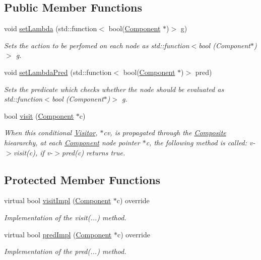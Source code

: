 \subsection*{Public Member Functions}
\begin{DoxyCompactItemize}
\item 
void \hyperlink{classVisitorLambda_a77004dd1388b4b7ebc5d1d6fe1adb747}{set\+Lambda} (std\+::function$<$ bool(\hyperlink{classComponent}{Component} $\ast$)$>$ g)
\begin{DoxyCompactList}\small\item\em Sets the action to be perfomed on each node as std\+::function$<$bool (\+Component$\ast$)$>$ g. \end{DoxyCompactList}\item 
void \hyperlink{classVisitorLambda_a46d9cc856e3fbc7155dd2212981a8902}{set\+Lambda\+Pred} (std\+::function$<$ bool(\hyperlink{classComponent}{Component} $\ast$)$>$ pred)
\begin{DoxyCompactList}\small\item\em Sets the predicate which checks whether the node should be evaluated as std\+::function$<$bool (\+Component$\ast$)$>$ g. \end{DoxyCompactList}\item 
bool \hyperlink{classVisitor_a3f8ea7ad6aa61e99d8d1bc0576bdf23c}{visit} (\hyperlink{classComponent}{Component} $\ast$c)
\begin{DoxyCompactList}\small\item\em When this conditional \hyperlink{classVisitor}{Visitor}, $\ast$cv, is propagated through the \hyperlink{classComposite}{Composite} hieararchy, at each \hyperlink{classComponent}{Component} node pointer $\ast$c, the following method is called\+: v-\/$>$visit(c), if v-\/$>$pred(c) returns true. \end{DoxyCompactList}\end{DoxyCompactItemize}
\subsection*{Protected Member Functions}
\begin{DoxyCompactItemize}
\item 
virtual bool \hyperlink{classVisitorLambda_af934df1d8669dd315d824d9ee706f250}{visit\+Impl} (\hyperlink{classComponent}{Component} $\ast$c) override
\begin{DoxyCompactList}\small\item\em Implementation of the visit(...) method. \end{DoxyCompactList}\item 
virtual bool \hyperlink{classVisitorLambda_ad41ffd99799d4ce452e5a9aaf6b62d46}{pred\+Impl} (\hyperlink{classComponent}{Component} $\ast$c) override
\begin{DoxyCompactList}\small\item\em Implementation of the pred(...) method. \end{DoxyCompactList}\end{DoxyCompactItemize}
